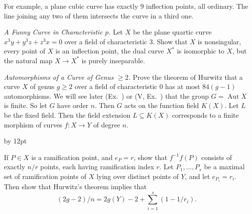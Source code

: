 {{{\noindent\hypertarget{ex-IV-2.3g}{}For example, a plane cubic curve has exactly $9$ inflection points, all ordinary. The line joining any two of them intersects the curve in a third one.

\noindent\hypertarget{ex-IV-2.3h}{}\par}

\smallskip
\noindent\hypertarget{ex-IV-2.4}{}\emph{A Funny Curve in Characteristic $p$.} Let $X$ be the plane quartic curve $x^3y+y^3z+z^3x=0$ over a field of characteristic $3$. Show that $X$ is nonsingular, every point of $X$ is an inflection point, the dual curve $X^*$ is isomorphic to $X$, but the natural map $X\to X^*$ is purely inseparable.

\smallskip
\noindent\hypertarget{ex-IV-2.5}{}\emph{Automorphisms of a Curve of Genus $\geq2$.} Prove the theorem of Hurwitz  that a curve $X$ of genus $g\geq2$ over a field of characteristic $0$ has at most $84(g-1)$ automorphisms. We will see later (Ex.~) or (V, Ex.~) that the group $G=\operatorname{Aut}X$ is finite. So let $G$ have order $n$. Then $G$ acts on the function field $K(X)$. Let $L$ be the fixed field. Then the field extension $L\subseteq K(X)$ corresponds to a finite morphism of curves $f\colon X\to Y$ of degree $n$.
{\advance\leftskip by 12pt\par
\noindent\hypertarget{ex-IV-2.5a}{}If $P\in X$ is a ramification point, and $e_P=r$, show that $f^{-1}f(P)$ consists of exactly $n/r$ points, each having ramification index $r$. Let $P_1,\ldots,P_s$ be a maximal set of ramification points of $X$ lying over distinct points of $Y$, and let $e_{P_i}=r_i$. Then show that Hurwitz's theorem implies that
\[
(2g-2)/n=2g(Y)-2+\sum_{i=1}^s(1-1/r_i).
\]\par}\par}
}
